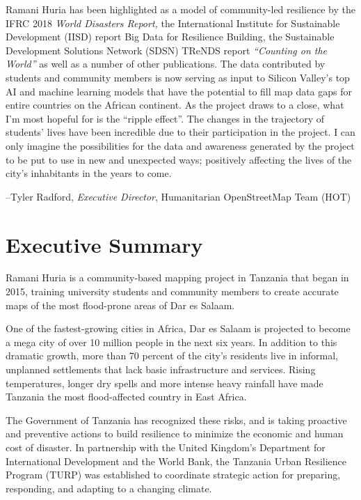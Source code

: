 \documentclass[a4paper,12pt,twoside]{article}
\begin{document}
\begin{multicols}{2}
Ramani Huria has been highlighted as a model of community-led resilience by the IFRC 2018 \textit{World Disasters Report,} the International Institute for Sustainable Development (IISD) report Big Data for Resilience Building, the Sustainable Development Solutions Network (SDSN) TReNDS report \textit{“Counting on the World”} as well as a number of other publications. The data contributed by students and community members is now serving as input to Silicon Valley’s top AI and machine learning models that have the potential to fill map data gaps for entire countries on the African continent. As the project draws to a close, what I’m most hopeful for is the “ripple effect”. The changes in the trajectory of students’ lives have been incredible due to their participation in the project. I can only imagine the possibilities for the data and awareness generated by the project to be put to use in new and unexpected ways; positively affecting the lives of the city’s inhabitants in the years to come.
\end{multicols}

--Tyler Radford, \textit{Executive Director}, Humanitarian OpenStreetMap Team (HOT)
\clearpage

\newpage
\section{Executive Summary}
\label{executivesummary}

Ramani Huria is a community-based mapping project in Tanzania that began in 2015, training university students and community members to create accurate maps of the most flood-prone areas of Dar es Salaam. 

One of the fastest-growing cities in Africa, Dar es Salaam is projected to become a mega city of over 10 million people in the next six years. In addition to this dramatic growth, more than 70 percent of the city's residents live in informal, unplanned settlements that lack basic infrastructure and services. Rising temperatures, longer dry spells and more intense heavy rainfall have made Tanzania the most flood-affected country in East Africa.

The Government of Tanzania has recognized these risks, and is taking proactive and preventive actions to build resilience to minimize the economic and human cost of disaster. In partnership with the United Kingdom's Department for International Development and the World Bank, the Tanzania Urban Resilience Program (TURP) was established to coordinate strategic action for preparing, responding, and adapting to a changing climate.
\end{document}
